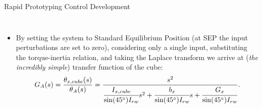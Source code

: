 \documentclass[slidestop,compress]{beamer}
\begin{document}
\begin{frame}[plain]
\begin{block}{\hspace{90 mm} Rapid Prototyping \hspace{210 mm} Control Development}
\begin{columns}
\begin{itemize}
\[
\sum M_0^{+ \circlearrowleft} = I_{x,cube} \ddot{\theta}_{x,cube} = T^0_{Ax} + T^0_{Bx} - T^0_{Cx} - T^0_{Dx} + T^0_x - \dot{\theta}_{x,cube} - G_x \theta_{x,cube}.
\] 

\item By setting the system to Standard Equilibrium Position (at SEP the input perturbations are set to zero), considering only a single input, substituting the torque-inertia relation,  and taking the Laplace transform we arrive at ({\emph{the incredibly simple}}) transfer function of the cube:
\[G_A(s)=\frac{\theta_{x,cube}(s)}{\theta_A(s)}=\frac{s^2}{\cfrac{I_{x,cube}}{\sin(45^{\circ}) I_{rw}}s^2 + \cfrac{b_x}{\sin(45^{\circ}) I_{rw}}s + \cfrac{G_x}{\sin(45^{\circ}) I_{rw}}}.
\]
\end{itemize}
\end{columns}
\end{block}    
\end{frame}
\end{document}
